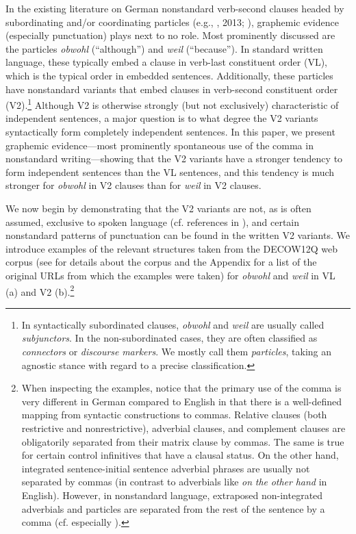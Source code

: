 In the existing literature on German nonstandard verb-second clauses headed by subordinating and/or coordinating particles (e.g., \citealt{AntomoSteinbach2010}, 2013; \citealt{Reis2013}), graphemic evidence (especially punctuation) plays next to no role. Most prominently discussed are the particles \textit{obwohl} (“although”) and \textit{weil} (“because”). In standard written language, these typically embed a clause in verb-last constituent order (VL), which is the typical order in embedded sentences. Additionally, these particles have nonstandard variants that embed clauses in verb-second constituent order (V2).\footnote{In syntactically subordinated clauses, \textit{obwohl} and \textit{weil} are usually called \textit{subjunctors}. In the non-subordinated cases, they are often classified as \textit{connectors} or \textit{discourse} \textit{markers}. We mostly call them \textit{particles}, taking an agnostic stance with regard to a precise classification.} Although V2 is otherwise strongly (but not exclusively) characteristic of independent sentences, a major question is to what degree the V2 variants syntactically form completely independent sentences. In this paper, we present graphemic evidence—most prominently spontaneous use of the comma in nonstandard writing—showing that the V2 variants have a stronger tendency to form independent sentences than the VL sentences, and this tendency is much stronger for \textit{obwohl} in V2 clauses than for \textit{weil} in V2 clauses.



We now begin by demonstrating that the V2 variants are not, as is often assumed, exclusive to spoken language (cf. references in ), and certain nonstandard patterns of punctuation can be found in the written V2 variants. We introduce examples of the relevant structures taken from the DECOW12Q web corpus (see  for details about the corpus and the Appendix for a list of the original URLs from which the examples were taken) for \textit{obwohl}  and \textit{weil}  in VL (a) and V2 (b).\footnote{When inspecting the examples, notice that the primary use of the comma is very different in German compared to English in that there is a well-defined mapping from syntactic constructions to commas. Relative clauses (both restrictive and nonrestrictive), adverbial clauses, and complement clauses are obligatorily separated from their matrix clause by commas. The same is true for certain control infinitives that have a clausal status. On the other hand, integrated sentence-initial sentence adverbial phrases are usually not separated by commas (in contrast to adverbials like \textit{on} \textit{the} \textit{other} \textit{hand} in English). However, in nonstandard language, extraposed non-integrated adverbials and particles are separated from the rest of the sentence by a comma (cf. especially ).}



